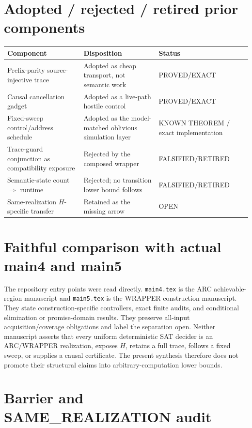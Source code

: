 \documentclass[11pt]{article}
\newcommand{\OPEN}{\textsf{OPEN}}
\newcommand{\EXACT}{\textsf{PROVED/EXACT}}
\newcommand{\KNOWN}{\textsf{KNOWN THEOREM}}
\newcommand{\RET}{\textsf{FALSIFIED/RETIRED}}
\begin{document}
\section*{Adopted / rejected / retired prior components}
\begin{center}
\begin{tabularx}{\textwidth}{p{}Xp{}}
\toprule
Component & Disposition & Status\\
\midrule
Prefix-parity source-injective trace & Adopted as cheap transport, not semantic
work & \EXACT{}\\
Causal cancellation gadget & Adopted as a live-path hostile control & \EXACT{}\\
Fixed-sweep control/address schedule & Adopted as the model-matched oblivious
simulation layer & \KNOWN{} / exact implementation\\
Trace-guard conjunction as compatibility exposure & Rejected by the composed
wrapper & \RET{}\\
Semantic-state count $\Rightarrow$ runtime & Rejected; no transition lower
bound follows & \RET{}\\
Same-realization $H$-specific transfer & Retained as the missing arrow & \OPEN{}\\
\bottomrule
\end{tabularx}
\end{center}

\section*{Faithful comparison with actual main4 and main5}
The repository entry points were read directly.  \texttt{main4.tex} is the ARC
achievable-region manuscript and \texttt{main5.tex} is the WRAPPER construction
manuscript.  They state construction-specific controllers, exact finite
audits, and conditional elimination or promise-domain results.  They preserve
all-input acquisition/coverage obligations and label the separation open.
Neither manuscript asserts that every uniform deterministic SAT decider is an
ARC/WRAPPER realization, exposes $H$, retains a full trace, follows a fixed
sweep, or supplies a causal certificate.  The present synthesis therefore
does not promote their structural claims into arbitrary-computation lower
bounds.

\section*{Barrier and SAME\_REALIZATION audit}
\end{document}
